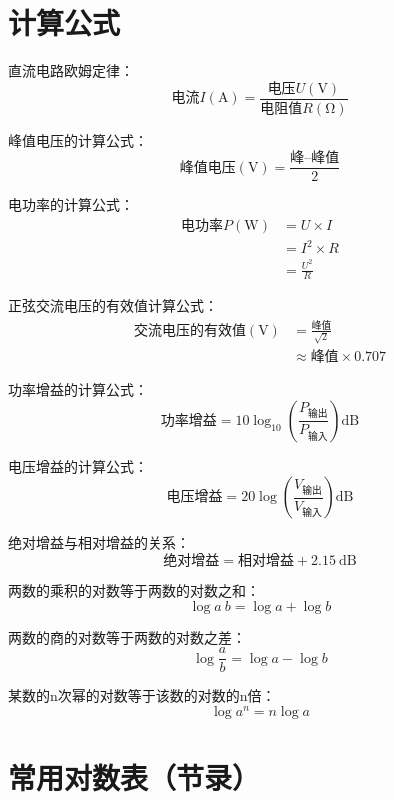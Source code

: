 \section{计算公式}

直流电路欧姆定律：
\[\mbox{电流}I(\si{\ampere})=\frac{\mbox{电压}U(\si{\volt})}{\mbox{电阻值}R(\si{\ohm})}\]

峰值电压的计算公式：
\[\mbox{峰值电压}(\si{\volt})=\frac{\mbox{峰--峰值}}{2}\]

电功率的计算公式：
\begin{equation*}
  \begin{aligned}
    \mbox{电功率}P(\si{\watt}) & = U\times I     \\
                            & = I^2 \times R  \\
                            & = \frac{U^2}{R}
  \end{aligned}
\end{equation*}

正弦交流电压的有效值计算公式：
\begin{equation*}
  \begin{aligned}
    \mbox{交流电压的有效值}(\si{\volt}) & =\frac{\mbox{峰值}}{\sqrt{2}}   \\
                                & \approx \mbox{峰值}\times 0.707
  \end{aligned}
\end{equation*}

功率增益的计算公式：
\[\mbox{功率增益}=10 \log_{10} \left( {\frac{P_{ \mbox{输出} }}{P_{ \mbox{输入} }}}\right) \si{\dB}\]

电压增益的计算公式：
\[\mbox{电压增益}=20 \log \left( {\frac{V_{ \mbox{输出} }}{V_{ \mbox{输入} }}} \right) \si{\dB}\]


绝对增益与相对增益的关系：
\[\mbox{绝对增益} = \mbox{相对增益} + \SI{2.15}{\dB}\]

两数的乘积的对数等于两数的对数之和：
\[\log a\: b=\log a+\log b\]

两数的商的对数等于两数的对数之差：
\[\log\frac{a}{b}=\log a-\log b\]

某数的n次幂的对数等于该数的对数的n倍：
\[\log a^n =n\log a\]

\newpage

\section{常用对数表（节录）}

